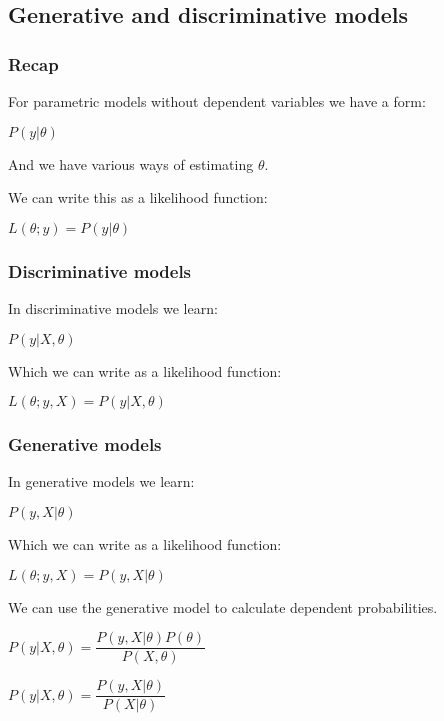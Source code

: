 
\subsection{Generative and discriminative models}

\subsubsection{Recap}

For parametric models without dependent variables we have a form:

\(P(y| \theta )\)

And we have various ways of estimating \(\theta \).

We can write this as a likelihood function:

\(L(\theta ;y )=P(y|\theta)\)

\subsubsection{Discriminative models}

In discriminative models we learn:

\(P(y|X, \theta )\)

Which we can write as a likelihood function:

\(L(\theta ;y, X )=P(y| X, \theta)\)

\subsubsection{Generative models}

In generative models we learn:

\(P(y, X| \theta )\)

Which we can write as a likelihood function:

\(L(\theta ;y, X )=P(y, X|\theta)\)

We can use the generative model to calculate dependent probabilities.

\(P(y| X, \theta )=\dfrac{P(y, X| \theta )P(\theta )}{P(X, \theta )}\)

\(P(y| X, \theta )=\dfrac{P(y, X| \theta )}{P(X| \theta )}\)

